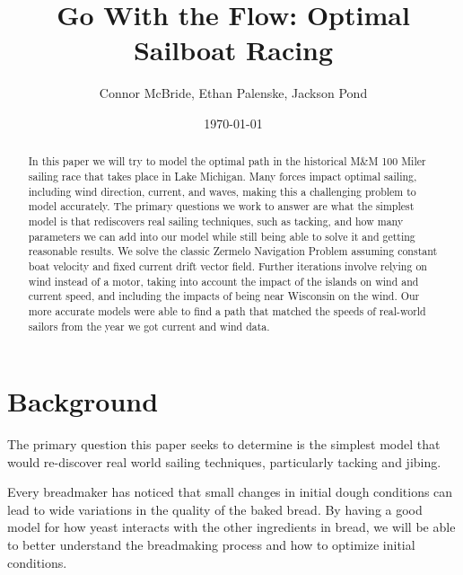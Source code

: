 \documentclass[11pt]{amsart}
\begin{document}
\title{Go With the Flow: Optimal Sailboat Racing}
\author{Connor McBride, Ethan Palenske, Jackson Pond}

\date{\today} %

\begin{abstract}
In this paper we will try to model the optimal path in the historical M\&M 100 Miler sailing race that takes place in Lake Michigan. Many forces impact optimal sailing, including wind direction, current, and waves, making this a challenging problem to model accurately. The primary questions we work to answer are what the simplest model is that rediscovers real sailing techniques, such as tacking, and how many parameters we can add into our model while still being able to solve it and getting reasonable results. We solve the classic Zermelo Navigation Problem assuming constant boat velocity and fixed current drift vector field. Further iterations involve relying on wind instead of a motor, taking into account the impact of the islands on wind and current speed, and including the impacts of being near Wisconsin on the wind. Our more accurate models were able to find a path that matched the speeds of real-world sailors from the year we got current and wind data.

\end{abstract}

\maketitle %

\section{Background}

\par The primary question this paper seeks to determine is the simplest model that would re-discover real world sailing techniques, particularly tacking and jibing. 

\par Every breadmaker has noticed that small changes in initial dough conditions can lead to wide variations in the quality of the baked bread. By having a good model for how yeast interacts with the other ingredients in bread, we will be able to better understand the breadmaking process and how to optimize initial conditions.

\end{document}
